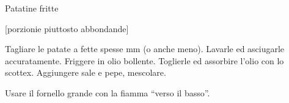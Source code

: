 \begin{recipe}{Patatine fritte}
    \begin{header}
        [porzionie piuttosto abbondande]

    \end{header}
    
    \begin{ingredients}[4]
    \end{ingredients}
    
    \begin{preparation}
        \step Tagliare le patate a fette spesse  mm (o anche meno).
        \step Lavarle ed asciugarle accuratamente.
        \step Friggere in olio bollente.
        \step Toglierle ed assorbire l'olio con lo scottex.
        \step Aggiungere sale e pepe, mescolare.
    \end{preparation}
    
    \begin{suggestion}
        \suggestionMark Usare il fornello grande con la fiamma ``verso il basso''.
    \end{suggestion}
    
\end{recipe}
